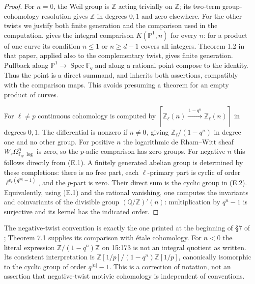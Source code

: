 \begin{proof}
For $n=0$, the Weil group is $\mathbb Z$ acting trivially on $\mathbb Z$;
its two-term group-cohomology resolution gives $\mathbb Z$ in degrees
$0,1$ and zero elsewhere. For the other twists we justify both finite
generation and the comparison used in the computation.
\citet[Proposition 9.4]{D_Geisser2004} gives the integral comparison
$K(\mathbb P^1,n)$ for every $n$: for a product of one curve its condition
$n\leq1$ or $n\geq d-1$ covers all integers. Theorem 1.2 in that paper,
applied also to the complementary twist, gives finite generation.
Pullback along $\mathbb P^1\to\operatorname{Spec}\mathbb F_q$ and along a
rational point compose to the identity. Thus the point is a direct
summand, and inherits both assertions, compatibly with the comparison
maps. This avoids presuming a theorem for an empty product of curves.

For $\ell\ne p$ continuous cohomology is computed by
$[\mathbb Z_\ell(n)\xrightarrow{\,1-q^n\,}\mathbb Z_\ell(n)]$ in degrees
$0,1$. The differential is nonzero if $n\ne0$, giving
$\mathbb Z_\ell/(1-q^n)$ in degree one and no other group.
For positive $n$ the logarithmic de Rham--Witt sheaf
$W_r\Omega^n_{\mathbb F_q,\log}$ is zero, so the $p$-adic comparison
has zero groups. For negative $n$ this follows directly from (E.1).
A finitely generated abelian group is determined by these completions:
there is no free part, each $\ell$-primary part is cyclic of order
$\ell^{v_\ell(q^{|n|}-1)}$, and the $p$-part is zero. Their direct sum
is the cyclic group in (E.2). Equivalently, using (E.1) and the rational
vanishing, one computes the invariants and coinvariants of the divisible
group $(\mathbb Q/\mathbb Z)'(n)$: multiplication by $q^n-1$ is
surjective and its kernel has the indicated order.
\end{proof}

The negative-twist convention is exactly the one printed at the beginning
of \S7 of \citet{D_Geisser2004}; Theorem 7.1 supplies its comparison with
\'etale cohomology. For $n<0$ the literal expression
$\mathbb Z/(1-q^n)\mathbb Z$ on 15:173 is not an integral quotient as
written. Its consistent interpretation is
$\mathbb Z[1/p]/(1-q^n)\mathbb Z[1/p]$, canonically isomorphic to the
cyclic group of order $q^{|n|}-1$. This is a correction of notation,
not an assertion that negative-twist motivic cohomology is independent
of conventions.

